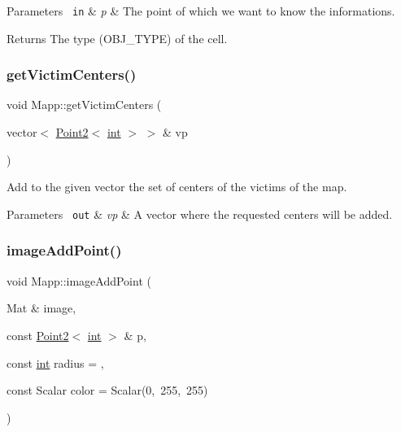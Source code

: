 \begin{DoxyParams}[1]{Parameters}
\mbox{\texttt{ in}}  & {\em p} & The point of which we want to know the informations. \\
\hline
\end{DoxyParams}
\begin{DoxyReturn}{Returns}
The type (O\+B\+J\+\_\+\+T\+Y\+PE) of the cell. 
\end{DoxyReturn}
\mbox{\label{class_mapp_a3b3ad207536bfb80c9ea2fd254bfdd80}} 
\subsubsection{\texorpdfstring{getVictimCenters()}{getVictimCenters()}}
{\footnotesize\ttfamily void Mapp\+::get\+Victim\+Centers (\begin{DoxyParamCaption}\item[{vector$<$ \mbox{\hyperlink{class_point2}{Point2}}$<$ \mbox{\hyperlink{draw_8hh_aa620a13339ac3a1177c86edc549fda9b}{int}} $>$ $>$ \&}]{vp }\end{DoxyParamCaption})}



Add to the given vector the set of centers of the victims of the map. 


\begin{DoxyParams}[1]{Parameters}
\mbox{\texttt{ out}}  & {\em vp} & A vector where the requested centers will be added. \\
\hline
\end{DoxyParams}
\mbox{\label{class_mapp_ad06f82a4d6eeab35c39ed955679061d3}} 
\subsubsection{\texorpdfstring{imageAddPoint()}{imageAddPoint()}}
{\footnotesize\ttfamily void Mapp\+::image\+Add\+Point (\begin{DoxyParamCaption}\item[{Mat \&}]{image,  }\item[{const \mbox{\hyperlink{class_point2}{Point2}}$<$ \mbox{\hyperlink{draw_8hh_aa620a13339ac3a1177c86edc549fda9b}{int}} $>$ \&}]{p,  }\item[{const \mbox{\hyperlink{draw_8hh_aa620a13339ac3a1177c86edc549fda9b}{int}}}]{radius = {},  }\item[{const Scalar}]{color = {\ttfamily Scalar(0,~255,~255)} }\end{DoxyParamCaption})}



